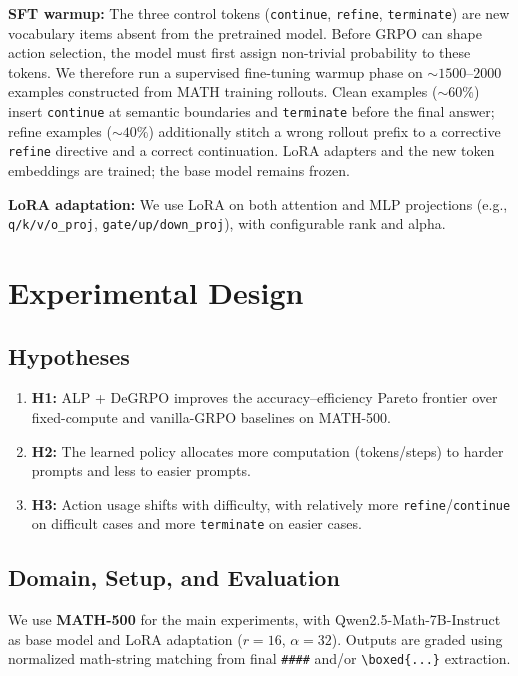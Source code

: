 \documentclass{article}
\begin{document}
\textbf{SFT warmup:} The three control tokens (\texttt{continue}, \texttt{refine}, \texttt{terminate}) are new vocabulary items absent from the pretrained model. Before GRPO can shape action selection, the model must first assign non-trivial probability to these tokens. We therefore run a supervised fine-tuning warmup phase on ${\sim}1500$--$2000$ examples constructed from MATH training rollouts. Clean examples (${\sim}60\%$) insert \texttt{continue} at semantic boundaries and \texttt{terminate} before the final answer; refine examples (${\sim}40\%$) additionally stitch a wrong rollout prefix to a corrective \texttt{refine} directive and a correct continuation. LoRA adapters and the new token embeddings are trained; the base model remains frozen.

\textbf{LoRA adaptation:} We use LoRA on both attention and MLP projections (e.g., \texttt{q/k/v/o\_proj}, \texttt{gate/up/down\_proj}), with configurable rank and alpha.

\section{Experimental Design}

\subsection{Hypotheses}

\begin{enumerate}
    \item \textbf{H1:} ALP + DeGRPO improves the accuracy--efficiency Pareto frontier over fixed-compute and vanilla-GRPO baselines on MATH-500.
    \item \textbf{H2:} The learned policy allocates more computation (tokens/steps) to harder prompts and less to easier prompts.
    \item \textbf{H3:} Action usage shifts with difficulty, with relatively more \texttt{refine}/\texttt{continue} on difficult cases and more \texttt{terminate} on easier cases.
\end{enumerate}

\subsection{Domain, Setup, and Evaluation}

We use \textbf{MATH-500} for the main experiments, with Qwen2.5-Math-7B-Instruct as base model and LoRA adaptation ($r{=}16$, $\alpha{=}32$). Outputs are graded using normalized math-string matching from final \texttt{\#\#\#\#} and/or \texttt{\textbackslash boxed\{...\}} extraction.
\end{document}
